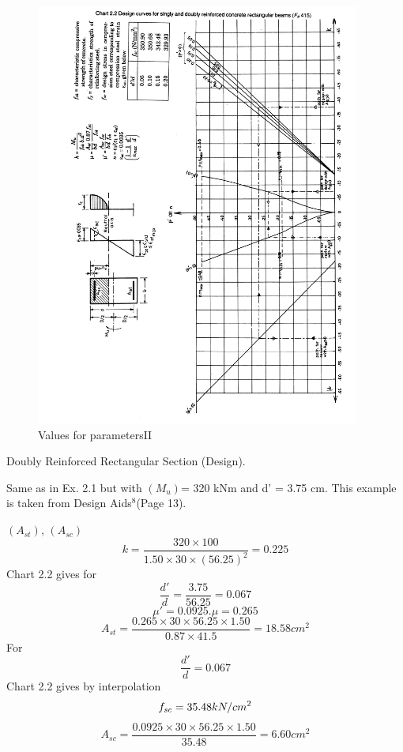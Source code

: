 \begin{figure}
\centering
\includegraphics[width=0.95\textwidth]{images/ch2-6.png}
\caption{Values for parametersII}
\label{Values for parametersII}
\end{figure}
\newpage
\begin{example} Doubly Reinforced Rectangular Section (Design).

\given Same as in Ex. 2.1 but with $(M_{u})$= 320 kNm and d’ = 3.75 cm. This example is taken
from Design Aids$^{8}$(Page 13).

\required $(A_{st})$, $(A_{sc})$
\solution
$$k=\frac{320 \times 100}{1.50 \times 30 \times (56.25)^2}=0.225$$
Chart 2.2 gives for
$$\frac{d'}{d}=\frac{3.75}{56.25}=0.067$$ 
$$\mu'=0.0925.\mu=0.265$$
$$A_{st}=\frac{0.265 \times 30\times 56.25 \times 1.50}{0.87 \times 41.5}=18.58cm^2$$
For
$$\frac{d'}{d}=0.067$$
Chart 2.2 gives by interpolation
$$f_{sc}=35.48kN/cm^2$$
$$A_{sc}=\frac{0.0925 \times 30 \times 56.25 \times 1.50}{35.48}=6.60cm^2$$
\end{example}


